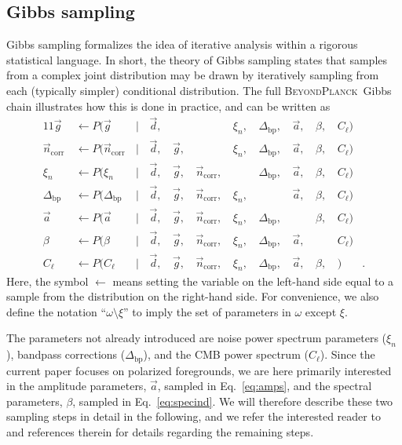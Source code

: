 \documentclass[twocolumn]{aa}
\renewcommand{\d}[0]{\vec{d}}
\newcommand{\n}[0]{\vec{n}}
\renewcommand{\a}[0]{\vec{a}}
\newcommand{\g}[0]{\vec{g}}
\newcommand{\Dbp}[0]{\Delta_{\mathrm{bp}}}
\newcommand{\BP}{\textsc{BeyondPlanck}}
\newcommand{\?}[1]{\textcolor{red}{{\bf [#1]}}}
\begin{document}
\subsection{Gibbs sampling}
\label{sec:gibbs}

Gibbs sampling formalizes the idea of iterative analysis within a rigorous
statistical language. In short, the theory of Gibbs sampling states that samples
from a complex joint distribution may be drawn by iteratively sampling from each
(typically simpler) conditional distribution. The full \BP\ Gibbs chain
\citep{bp01} illustrates how this is done in practice, and can be written as
\begin{alignat}{11}
\g &\,\leftarrow P(\g&\,\mid&\,\d,&\, & &\,\xi_n, &\,\Dbp, &\,\a, &\,\beta, &\,C_{\ell})\\
\n_{\mathrm{corr}} &\,\leftarrow P(\n_{\mathrm{corr}}&\,\mid&\,\d, &\,\g, &\,&\,\xi_n, &\,\Dbp, &\,\a, &\,\beta, &\,C_{\ell})\\
\xi_n &\,\leftarrow P(\xi_n&\,\mid&\,\d, &\,\g, &\,\n_{\mathrm{corr}}, &\,&\,\Dbp, &\,\a, &\,\beta, &\,C_{\ell})\\
\Dbp &\,\leftarrow P(\Dbp&\,\mid&\,\d, &\,\g, &\,\n_{\mathrm{corr}}, &\,\xi_n, &\,&\,\a, &\,\beta, &\,C_{\ell})\\
\a &\,\leftarrow P(\a&\,\mid&\,\d, &\,\g, &\,\n_{\mathrm{corr}}, &\,\xi_n, &\,\Dbp, &\,&\,\beta, &\,C_{\ell})\label{eq:amps}\\
\beta &\,\leftarrow P(\beta&\,\mid&\,\d, &\,\g, &\,\n_{\mathrm{corr}}, &\,\xi_n, &\,\Dbp, &\,\a,&\,&\,C_{\ell}) \label{eq:specind}\\
C_\ell &\,\leftarrow P(C_\ell&\,\mid&\,\d, &\,\g, &\,\n_{\mathrm{corr}}, &\,\xi_n, &\,\Dbp,&\,\a, &\,\beta, &\,)&.
\end{alignat}
Here, the symbol $\leftarrow$ means setting the variable on the left-hand side
equal to a sample from the distribution on the right-hand side. For convenience,
we also define the notation ``$\omega\setminus \xi$'' to imply the set of
parameters in $\omega$ except $\xi$.

The parameters not already introduced are noise power spectrum
parameters ($\xi_n$),
bandpass corrections ($\Dbp$), and the CMB power spectrum
($C_{\ell}$). Since the current paper focuses on polarized
foregrounds, we are here primarily interested in the amplitude
parameters, $\a$, sampled in Eq.~\eqref{eq:amps}, and the spectral
parameters, $\beta$, sampled in Eq.~\eqref{eq:specind}. We will
therefore describe these two sampling steps in detail in the
following, and we refer the interested reader to \citet{bp01} and
references therein for details regarding the remaining steps.
\end{document}
